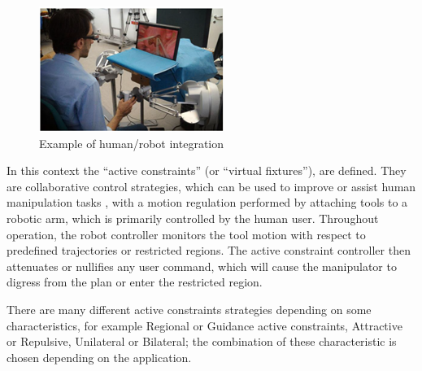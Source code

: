 \documentclass[conference]{IEEEtran}
\begin{document}
    \begin{figure}[h!]
        \centering
        \includegraphics{intro1.png}
        \caption{Example of human/robot integration}
        \label{fig:intro1}
    \end{figure}

    In this context the “active constraints” (or “virtual fixtures”), are
    defined. They are collaborative control strategies, which can be used
    to improve or assist human manipulation tasks \cite{acvf}, with a
    motion regulation performed by attaching tools to a robotic arm, which
    is primarily controlled by the human user. Throughout operation, the
    robot controller monitors the tool motion with respect to predefined
    trajectories or restricted regions. The active constraint controller
    then attenuates or nullifies any user command, which will cause the
    manipulator to digress from the plan or enter the restricted region.

    There are many different active constraints strategies depending on
    some characteristics, for example Regional or Guidance active
    constraints, Attractive or Repulsive, Unilateral or
    Bilateral\cite{acvf}; the combination of these characteristic is
    chosen depending on the application. 
\end{document}
